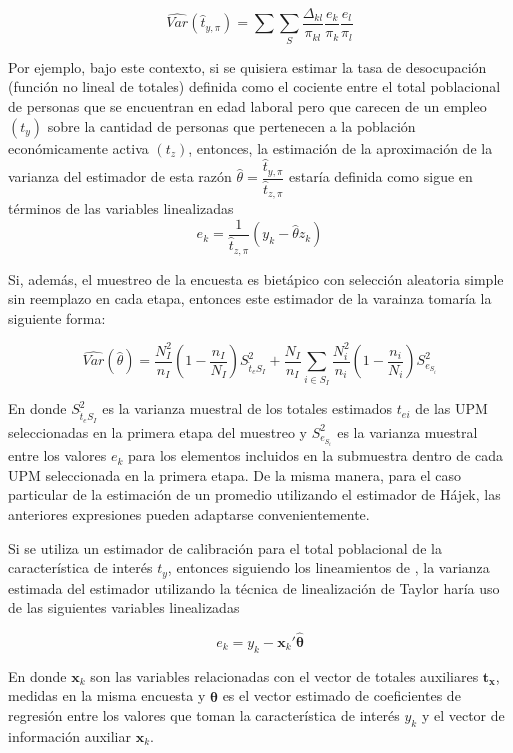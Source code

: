 \documentclass[
  12pt,
]{book}
\begin{document}
\[
    \widehat{Var}(\hat{t}_{y,\pi})=\sum\sum_S \dfrac{\Delta_{kl}}{\pi_{kl}}\frac{e_k}{\pi_k}\frac{e_l}{\pi_l}
\]

Por ejemplo, bajo este contexto, si se quisiera estimar la tasa de desocupación (función no lineal de totales) definida como el cociente entre el total poblacional de personas que se encuentran en edad laboral pero que carecen de un empleo \(({t}_{y})\) sobre la cantidad de personas que pertenecen a la población económicamente activa \(({t}_{z})\), entonces, la estimación de la aproximación de la varianza del estimador de esta razón \(\hat{\theta}=\dfrac{\hat{t}_{y,\pi}}{\hat{t}_{z,\pi}}\) estaría definida como sigue en términos de las variables linealizadas
\[
e_k=\dfrac{1}{\hat{t}_{z,\pi}}(y_k-\hat{\theta}z_k)
\]

Si, además, el muestreo de la encuesta es bietápico con selección aleatoria simple sin reemplazo en cada etapa, entonces este estimador de la varainza tomaría la siguiente forma:

\[
\widehat{Var}(\hat{\theta})=\frac{N_{I}^2}{n_{I}}\left(1-\frac{n_{I}}{N_{I}}\right)S^2_{\hat{t}_{e}S_I}+
\frac{N_{I}}{n_{I}}\sum_{i\in S_{I}}\frac{N_i^2}{n_i}\left(1-\frac{n_i}{N_i}\right)S^2_{e_{S_i}}
\]

En donde \(S^2_{\hat{t}_{e}S_I}\) es la varianza muestral de los totales estimados \(t_{ei}\) de las UPM seleccionadas en la primera etapa del muestreo y \(S^2_{e_{S_i}}\) es la varianza muestral entre los valores \(e_k\) para los elementos incluidos en la submuestra dentro de cada UPM seleccionada en la primera etapa. De la misma manera, para el caso particular de la estimación de un promedio utilizando el estimador de Hájek, las anteriores expresiones pueden adaptarse convenientemente.

Si se utiliza un estimador de calibración para el total poblacional de la característica de interés \(t_y\), entonces siguiendo los lineamientos de \citet[sección 10.6]{Gutierrez_2016}, la varianza estimada del estimador utilizando la técnica de linealización de Taylor haría uso de las siguientes variables linealizadas

\[
e_k=y_k-\mathbf{x}_k'\mathbf{\hat{\theta}}
\]

En donde \(\mathbf{x}_k\) son las variables relacionadas con el vector de totales auxiliares \(\mathbf{t}_{\mathbf{x}}\), medidas en la misma encuesta y \(\mathbf{\hat{\theta}}\) es el vector estimado de coeficientes de regresión entre los valores que toman la característica de interés \(y_k\) y el vector de información auxiliar \(\mathbf{x}_k\).
\end{document}
